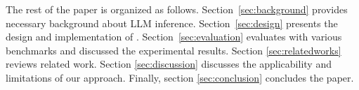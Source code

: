 The rest of the paper is organized as follows. Section~\ref{sec:background} provides necessary background about LLM inference.
Section~\ref{sec:design} presents the design and implementation of \thisproj{}. 
Section~\ref{sec:evaluation} evaluates \thisproj{} with various benchmarks and discussed the experimental results. 
Section \ref{sec:relatedworks} reviews related work.
Section \ref{sec:discussion} discusses the applicability and limitations of our approach.
Finally, section \ref{sec:conclusion} concludes the paper.





